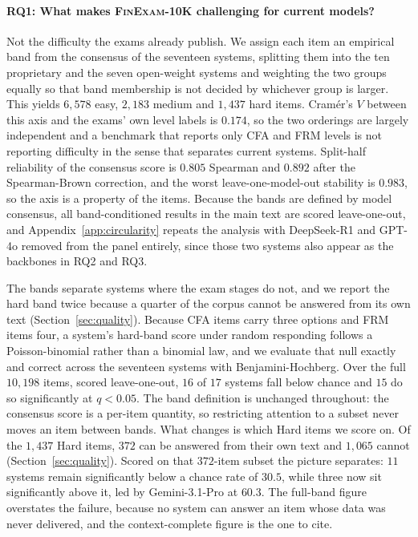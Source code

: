 \paragraph{RQ1: What makes \textsc{FinExam-10K} challenging for current models?}
Not the difficulty the exams already publish. We assign each item an empirical band from the
consensus of the seventeen systems, splitting them into the ten proprietary and the seven
open-weight systems and weighting the two groups equally so that band membership is not decided
by whichever group is larger. This yields $6{,}578$ easy, $2{,}183$ medium and $1{,}437$ hard
items. Cram\'er's $V$ between this axis and the exams' own level labels is $0.174$, so the two
orderings are largely independent and a benchmark that reports only CFA and FRM levels is not
reporting difficulty in the sense that separates current systems. Split-half reliability of the
consensus score is $0.805$ Spearman and $0.892$ after the Spearman-Brown correction, and the
worst leave-one-model-out stability is $0.983$, so the axis is a property of the items. Because
the bands are defined by model consensus, all band-conditioned results in the main text are
scored leave-one-out, and Appendix~\ref{app:circularity} repeats the analysis with DeepSeek-R1
and GPT-4o removed from the panel entirely, since those two systems also appear as the
backbones in RQ2 and RQ3.

The bands separate systems where the exam stages do not, and we report the hard band twice
because a quarter of the corpus cannot be answered from its own text (Section~\ref{sec:quality}).
Because CFA items carry three options and FRM items four, a system's hard-band score under
random responding follows a Poisson-binomial rather than a binomial law, and we evaluate that
null exactly and correct across the seventeen systems with Benjamini-Hochberg. Over the full
$10{,}198$ items, scored leave-one-out, $16$ of $17$ systems fall below chance and $15$ do so
significantly at $q<0.05$. The band definition is unchanged throughout: the consensus score is a
per-item quantity, so restricting attention to a subset never moves an item between bands. What
changes is which Hard items we score on. Of the $1{,}437$ Hard items, $372$ can be answered from
their own text and $1{,}065$ cannot (Section~\ref{sec:quality}). Scored on that $372$-item
subset the picture separates: $11$ systems remain significantly below a chance rate of $30.5$,
while three now sit significantly above it, led by Gemini-3.1-Pro at $60.3$. The full-band figure
overstates the failure, because no system can answer an item whose data was never delivered, and
the context-complete figure is the one to cite.

